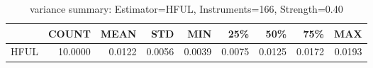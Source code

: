 \begin{table}[ht]
\centering
\caption{variance summary: Estimator=HFUL, Instruments=166, Strength=0.40}
\begin{tabular}{lrrrrrrrr}
\toprule
 & COUNT & MEAN & STD & MIN & 25\% & 50\% & 75\% & MAX \\
\midrule
HFUL & 10.0000 & 0.0122 & 0.0056 & 0.0039 & 0.0075 & 0.0125 & 0.0172 & 0.0193 \\
\bottomrule
\end{tabular}
\end{table}
